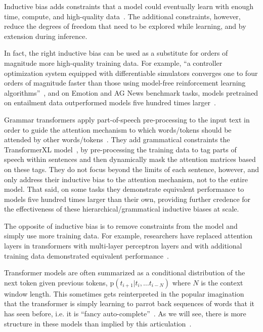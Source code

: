 \documentclass{article}
\begin{document}
Inductive bias adds constraints that a model could eventually learn with enough time, compute, and high-quality data~\citep{welling2019}. The additional constraints, however, reduce the degrees of freedom that need to be explored while learning, and by extension during inference.

In fact, the right inductive bias can be used as a substitute for orders of magnitude more high-quality training data.  For example, ``a controller optimization system equipped with differentiable simulators converges one to four orders of magnitude faster than those using model-free reinforcement learning algorithms''~\citep{10.5555/3327757.3327820},  and on Emotion and AG News benchmark tasks, models pretrained on entailment data outperformed models five hundred times larger~\citep{ge-etal-2023-entailment}.

Grammar transformers apply part-of-speech pre-processing to the input text in order to guide the attention mechanism to which words/tokens should be attended by other words/tokens~\citep{sartran2022transformer}.  They add grammatical constraints the TransformerXL model~\citep{dai2019transformerxl}, by pre-processing the training data to tag parts of speech within sentences and then dynamically mask the attention matrices based on these tags. They do not focus beyond the limits of each sentence, however, and only address their inductive bias to the attention mechanism, not to the entire model.  That said, on some tasks they demonstrate equivalent performance to models five hundred times larger than their own, providing further credence for the effectiveness of these hierarchical/grammatical inductive biases at scale.

The opposite of inductive bias is to remove constraints from the model and simply use more training data. For example, researchers have replaced attention layers in transformers with multi-layer perceptron layers and with additional training data demonstrated equivalent performance~\citep{liu2021pay}.

Transformer models are often summarized as a conditional distribution of the next token given previous tokens, p$(t_{i+1} | t_i, \ldots t_{i-N})$ where $N$ is the context window length. This sometimes gets reinterpreted in the popular imagination that the transformer is simply learning to parrot back sequences of words that it has seen before, i.e. it is ``fancy auto-complete''~\citep{marcus2023sentence}.  As we will see, there is more structure in these models than implied by this articulation~\citep{veres2022large}. %
\end{document}
